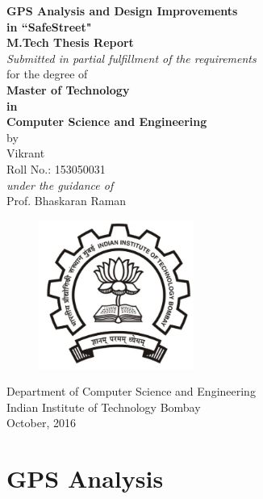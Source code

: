 \documentclass[seminar]{report} \usepackage{longtable} \usepackage{tabu}
\begin{document}
\begin{center}
  {\LARGE \textbf{GPS Analysis and Design Improvements \\[0.1in] in ``SafeStreet" }}\\[0.4in]
  {\large \textbf{M.Tech Thesis Report}}\\[0.2in]
  {\large \textit{Submitted in partial fulfillment of the requirements}\\
    for the degree of}\\[0.2in]
  {\large \textbf{Master of Technology\\
      in\\
      Computer Science and Engineering}}\\[0.2in]
  \large by\\[0.1in]
  {\Large Vikrant\\Roll No.: 153050031}\\[0.1in]

  \Large \textit{under the guidance of}\\[0.1in]
  {\Large Prof. Bhaskaran Raman}\\[0.3in]
  \begin{figure}[h]
    \centering
    \includegraphics[width=2in]{iitb-black}
  \end{figure}

  {\Large Department of Computer Science and Engineering\\[0.1in]
    Indian Institute of Technology Bombay\\[0.1in]
    October, 2016 }
\end{center}
\pagebreak

\begin{abstract}
\end{abstract}

\tableofcontents


\setcounter{page}{1} 


% 

\section{GPS Analysis}
\end{document}

